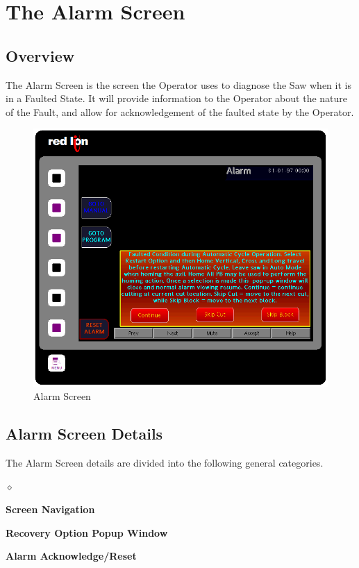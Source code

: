 \chapter{The Alarm Screen}
\section{Overview}
The Alarm Screen is the screen the Operator uses to diagnose the Saw when it is in a Faulted State. It will provide information to the Operator about the nature of the Fault, and allow for acknowledgement of the faulted state by the Operator.
\begin{figure}
	\centering
	\includegraphics[width=0.5
	\linewidth]{screen-captures/alarms/alarms}
	\caption{Alarm Screen}
	\label{fig:alarm-screen}
\end{figure}
\pagebreak
\section{Alarm Screen Details}
The Alarm Screen details are divided into the following general categories.
\begin{list}{$\diamond$}{}
	\item \textbf{Screen Navigation}
	\item \textbf{Recovery Option Popup Window}
	\item \textbf{Alarm Acknowledge/Reset}
\end{list}

